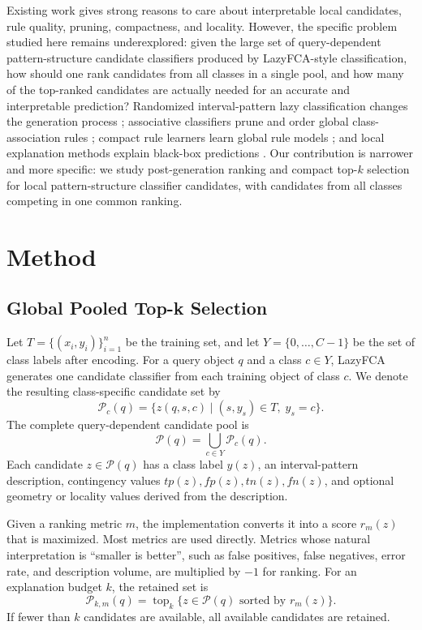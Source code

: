 \documentclass[11pt]{article}
\begin{document}
Existing work gives strong reasons to care about interpretable local
candidates, rule quality, pruning, compactness, and locality. However, the
specific problem studied here remains underexplored: given the large set of
query-dependent pattern-structure candidate classifiers produced by
LazyFCA-style classification, how should one rank candidates from all classes
in a single pool, and how many of the top-ranked candidates are actually
needed for an accurate and interpretable prediction? Randomized interval-pattern lazy
classification changes the generation process \cite{masyutin2015lazy};
associative classifiers prune and order global class-association rules
\cite{liu1998integrating,li2001cmar,baralis2008lazy}; compact rule learners
learn global rule models \cite{letham2015interpretable,angelino2018learning};
and local explanation methods explain black-box predictions
\cite{ribeiro2016should}. Our contribution is narrower and more specific:
we study post-generation ranking and compact top-$k$ selection for local
pattern-structure classifier candidates, with candidates from all classes
competing in one common ranking.

\section{Method}

\subsection{Global Pooled Top-k Selection}

Let $T=\{(x_i,y_i)\}_{i=1}^{n}$ be the training set, and let
$Y=\{0,\ldots,C-1\}$ be the set of class labels after encoding. For a query
object $q$ and a class $c \in Y$, LazyFCA generates one candidate classifier
from each training object of class $c$. We denote the resulting class-specific
candidate set by
\[
    \mathcal{P}_c(q) = \{z(q,s,c) \mid (s,y_s) \in T,\; y_s=c\}.
\]
The complete query-dependent candidate pool is
\[
    \mathcal{P}(q) = \bigcup_{c \in Y} \mathcal{P}_c(q).
\]
Each candidate $z \in \mathcal{P}(q)$ has a class label $y(z)$, an
interval-pattern description, contingency values $tp(z),fp(z),tn(z),fn(z)$, and optional
geometry or locality values derived from the description.

Given a ranking metric $m$, the implementation converts it into a score
$r_m(z)$ that is maximized. Most metrics are used directly. Metrics whose
natural interpretation is ``smaller is better'', such as false positives,
false negatives, error rate, and description volume, are multiplied by $-1$
for ranking. For an explanation budget $k$, the retained set is
\[
    \mathcal{P}_{k,m}(q) =
    \operatorname{top}_k\{z \in \mathcal{P}(q) \text{ sorted by } r_m(z)\}.
\]
If fewer than $k$ candidates are available, all available candidates are
retained.
\end{document}
